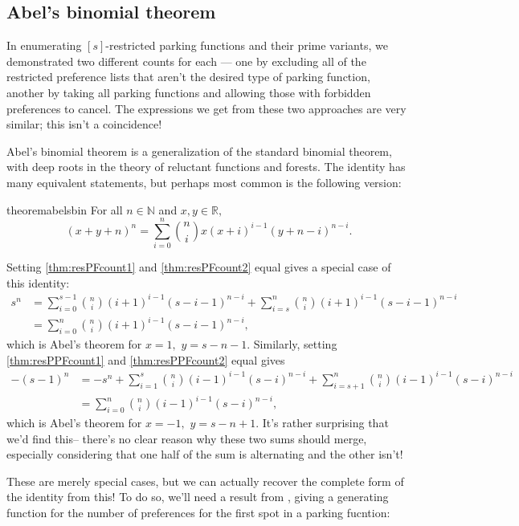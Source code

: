 \documentclass[12 pt]{amsart}
\theoremstyle{definition} %
\theoremstyle{remark} %
\begin{document}
\subsection{Abel's binomial theorem}

In enumerating $[s]$-restricted parking functions and their prime variants, we demonstrated two different counts for each --- one by excluding all of the restricted preference lists that aren't the desired type of parking function, another by taking all parking functions and allowing those with forbidden preferences to cancel. The expressions we get from these two approaches are very similar; this isn't a coincidence!

Abel's binomial theorem is a generalization of the standard binomial theorem, with deep roots in the theory of reluctant functions and forests. The identity has many equivalent statements, but perhaps most common is the following version:

\begin{restatable}{theorem}{abelsbin}
	For all $n\in\mathbb{N}$ and $x,y\in\mathbb{R},$
    \[
		(x + y + n)^{n} = \sum_{i = 0}^{n} \binom{n}{i} x (x + i)^{i - 1} (y + n - i)^{n - i}.
	\]
\end{restatable}

Setting \cref{thm:resPFcount1} and \cref{thm:resPFcount2} equal gives a special case of this identity:
\begin{align*}
    s^{n} &= \sum_{i = 0}^{s - 1} \binom{n}{i} (i + 1)^{i - 1} (s - i - 1)^{n - i} + \sum_{i = s}^{n} \binom{n}{i} (i + 1)^{i - 1} (s - i - 1)^{n - i}\\
    &=\sum_{i = 0}^{n} \binom{n}{i} (i + 1)^{i - 1} (s - i - 1)^{n - i},
\end{align*}
which is Abel's theorem for $x=1,$ $y=s-n-1.$ Similarly, setting \cref{thm:resPPFcount1} and \cref{thm:resPPFcount2} equal gives 
\begin{align*}
    - (s - 1)^{n} &= -s^n + \sum_{i = 1}^{s} \binom{n}{i} (i - 1)^{i - 1} (s - i)^{n - i} + \sum_{i = s + 1}^{n} \binom{n}{i} (i - 1)^{i - 1} (s - i)^{n - i}\\
    &=\sum_{i=0}^n \binom{n}{i} (i - 1)^{i - 1} (s - i)^{n - i},
\end{align*}
which is Abel's theorem for $x=-1,$ $y=s-n+1.$ It's rather surprising that we'd find this-- there's no clear reason why these two sums should merge, especially considering that one half of the sum is alternating and the other isn't!

These are merely special cases, but we can actually recover the complete form of the identity from this! To do so, we'll need a result from \cite{yan-survey-2015}, giving a generating function for the number of preferences for the first spot in a parking fucntion:
\end{document}
